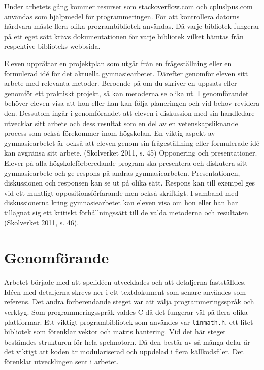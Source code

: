 \documentclass[12pt, a4paper]{article}
\newcommand{\code}{\texttt}
\begin{document}
	Under arbetets gång kommer resurser som stackoverflow.com och cpluslpus.com användas som hjälpmedel för programmeringen. För att kontrollera datorns hårdvara måste flera olika programbibliotek användas. Då varje bibliotek fungerar på ett eget sätt krävs dokumentationen för varje bibliotek vilket hämtas från respektive biblioteks webbsida. 
	
	\begin{small}
		Eleven upprättar en projektplan som utgår från en frågeställning eller en
formulerad idé för det aktuella gymnasiearbetet. Därefter genomför eleven sitt
arbete med relevanta metoder. Beroende på om du skriver en uppsats eller
genomför ett praktiskt projekt, så kan metoderna se olika ut. I genomförandet
behöver eleven visa att hon eller han kan följa planeringen och vid behov
revidera den. Dessutom ingår i genomförandet att eleven i diskussion med sin
handledare utvecklar sitt arbete och dess resultat som en del av en
vetenskapsliknande process som också förekommer inom högskolan. En viktig
aspekt av gymnasiearbetet är också att eleven genom sin frågeställning eller
formulerade idé kan avgränsa sitt arbete. (Skolverket 2011, s. 45)
Opponering och presentationer. Elever på alla högskoleförberedande program
ska presentera och diskutera sitt gymnasiearbete och ge respons på andras
gymnasiearbeten. Presentationen, diskussionen och responsen kan se ut på
olika sätt. Respons kan till exempel ges vid ett muntligt oppositionsförfarande
men också skriftligt. I samband med diskussionerna kring gymnasiearbetet kan
eleven visa om hon eller han har tillägnat sig ett kritiskt förhållningssätt till de
valda metoderna och resultaten (Skolverket 2011, s. 46).
	\end{small}
	
	\newpage
	\section{Genomförande}
	
	Arbetet började med att spelidéen utvecklades och att detaljerna fastställdes. Idéen med detaljerna skrevs ner i ett textdokument som senare användes som referens. Det andra förberendande steget var att välja programmeringsspråk och verktyg. Som programmeringsspråk valdes C då det fungerar väl på flera olika plattformar. Ett viktigt programbibliotek som användes var \code{linmath.h}, ett litet bibliotek som förenklar vektor och matris hantering. Vid det här steget bestämdes strukturen för hela spelmotorn. Då den består av så många delar är det viktigt att koden är modulariserad och uppdelad i flera källkodsfiler. Det förenklar utvecklingen sent i arbetet. 
	
\end{document}
